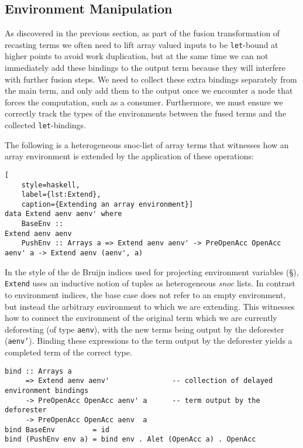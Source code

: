 \subsection{Environment Manipulation}

As discovered in the previous section, as part of the fusion transformation of
recasting terms we often need to lift array valued inputs to be
\texttt{let}-bound at higher points to avoid work duplication, but at the same
time we can not immediately add these bindings to the output term because they
will interfere with further fusion steps. We need to collect these extra
bindings separately from the main term, and only add them to the output once we
encounter a node that forces the computation, such as a consumer. Furthermore,
we must ensure we correctly track the types of the environments between the
fused terms and the collected \texttt{let}-bindings.

The following is a heterogeneous snoc-list of array terms that witnesses how an
array environment is extended by the application of these operations:
%
\begin{lstlisting}[
    style=haskell,
    label={lst:Extend},
    caption={Extending an array environment}]
data Extend aenv aenv' where
    BaseEnv ::                                                                Extend aenv aenv
    PushEnv :: Arrays a => Extend aenv aenv' -> PreOpenAcc OpenAcc aenv' a -> Extend aenv (aenv', a)
\end{lstlisting}
%
In the style of the de Bruijn indices used for projecting environment variables
(\S\derp), \texttt{Extend} uses an inductive notion of tuples as heterogeneous
\emph{snoc} lists. In contrast to environment indices, the base case does not
refer to an empty environment, but instead the arbitrary environment to which we
are extending. This witnesses how to connect the environment of the original
term which we are currently deforesting (of type \texttt{aenv}), with the new
terms being output by the deforester (\texttt{aenv'}). Binding these expressions
to the term output by the deforester yields a completed term of the correct
type.
%
\begin{lstlisting}[style=haskell]
bind :: Arrays a
     => Extend aenv aenv'               -- collection of delayed environment bindings
     -> PreOpenAcc OpenAcc aenv' a      -- term output by the deforester
     -> PreOpenAcc OpenAcc aenv  a
bind BaseEnv         = id
bind (PushEnv env a) = bind env . Alet (OpenAcc a) . OpenAcc
\end{lstlisting}


